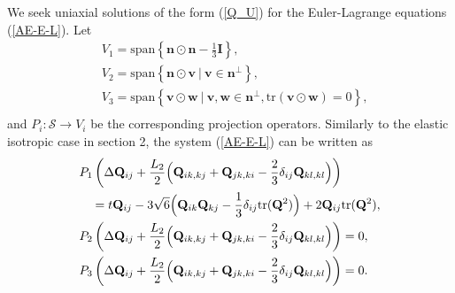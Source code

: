 \documentclass[10pt, a4paper]{article}
\newcommand\n{\mathbf{n}}
\newcommand\vvec{\mathbf{v}}
\newcommand\w{\mathbf{w}}
\newcommand\Qvec{\mathbf{Q}}
\newcommand\tr{\mathrm{tr}}
\begin{document}
We seek uniaxial solutions of the form (\ref{Q_U}) for the Euler-Lagrange equations (\ref{AE-E-L}). Let
\begin{equation}
  \begin{aligned}
    & V_1 = \mathrm{span} \left\{ \n \odot \n  - \frac{1}{3} \mathbf{I} \right\}, \\
    & V_2 = \mathrm{span} \left\{ \n \odot \vvec ~|~  \vvec \in \n^{\perp} \right\}, \\
    & V_3 = \mathrm{span} \left\{ \vvec \odot \w ~|~ \vvec, \w \in \n^{\perp}, \tr (\vvec \odot \w) = 0 \right\}, \\
    \end{aligned} 
\end{equation}
and  $P_i : \mathcal{S} \rightarrow V_i$ be the corresponding projection operators. Similarly to the elastic isotropic case in section 2, %
the system (\ref{AE-E-L}) can be written as
\begin{equation}\label{AE_P}
  \begin{aligned}
    & P_1 \left( \Delta \Qvec_{ij} + \frac{L_2}{2} \Bigl( \Qvec_{ik,kj} + \Qvec_{jk,ki}  - \frac{2}{3} \delta_{ij} \Qvec_{kl, kl} \Bigr) \right)  \\
    &  ~~~  = t \Qvec_{ij} - 3 \sqrt{6} \Bigl( \Qvec_{ik}\Qvec_{kj} - \frac{1}{3} \delta_{ij} \tr(\Qvec^2) \Bigr) + 2 \Qvec_{ij} \tr(\Qvec^2), \\
    & P_2 \left(\Delta \Qvec_{ij} + \frac{L_2}{2} \Bigl( \Qvec_{ik,kj} + \Qvec_{jk,ki}  - \frac{2}{3} \delta_{ij} \Qvec_{kl, kl} \Bigr) \right) = 0, \\
    & P_3 \left(\Delta \Qvec_{ij} + \frac{L_2}{2} \Bigl( \Qvec_{ik,kj} + \Qvec_{jk,ki}  - \frac{2}{3} \delta_{ij} \Qvec_{kl, kl} \Bigr) \right) = 0.   \\
  \end{aligned}
\end{equation}

\end{document}
